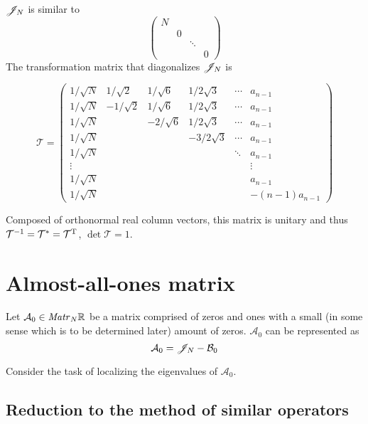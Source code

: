 \documentclass{article}
\begin{document}
\begin{propose}
    $\mathscr{J}_{N}$ is similar to
    $$\begin{pmatrix}
        N &   &        & \\
        & 0 &        & \\
        &   & \ddots & \\
        &   &        & 0
    \end{pmatrix}$$
    The transformation matrix that diagonalizes $\mathscr{J}_{N}$ is

    $$\mathcal T =
    \begin{pmatrix}
        1/\sqrt N &  1/\sqrt2 & 1/\sqrt6  & 1/2\sqrt3  & \cdots & a_{n-1} \\
        1/\sqrt N & -1/\sqrt2 & 1/\sqrt6  & 1/2\sqrt3  & \cdots & a_{n-1} \\
        1/\sqrt N &           & -2/\sqrt6 & 1/2\sqrt3  & \cdots & a_{n-1} \\
        1/\sqrt N &           &           & -3/2\sqrt3 & \cdots & a_{n-1} \\
        1/\sqrt N &           &           &            & \ddots & a_{n-1} \\
        \vdots    &           &           &            &        & \vdots  \\
        1/\sqrt N &           &           &            &        & a_{n-1} \\
        1/\sqrt N &           &           &            &        & -(n-1)a_{n-1}
    \end{pmatrix}$$

    Composed of orthonormal real column vectors, this matrix is unitary
    and thus $\mathcal T^{-1} = \mathcal T^{\mathrm{*}} = \mathcal T^{\mathrm{T}}$,
    $\det\mathcal T = 1$.
\end{propose}

\section{Almost-all-ones matrix}
Let $\mathcal A_0\in\mathit{Matr}_{N} {\mathbb{R}}$ be a matrix comprised of zeros and ones
with a small (in some sense which is to be determined later) amount of zeros.
$\mathcal A_0$ can be represented as
$$\mathcal A_0 = \mathscr{J}_{N} - \mathcal B_0$$

Consider the task of localizing the eigenvalues of $\mathcal A_0$.

\subsection{Reduction to the method of similar operators}
% 
\end{document}
